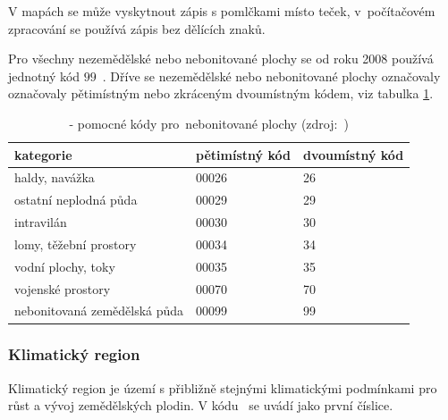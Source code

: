 V mapách se může vyskytnout zápis s pomlčkami místo teček, v~počítačovém zpracování se používá zápis bez dělících znaků.

Pro všechny nezemědělské nebo nebonitované plochy se od roku 2008 používá jednotný kód $99$~\citep{metodika_bpej}. Dříve se nezemědělské nebo nebonitované plochy označovaly označovaly pětimístným nebo zkráceným dvoumístným kódem, viz tabulka \ref{tab:pomocne_kody_bpej}.

\begin{table}[H]
    \begin{tabular}{|l|l|l|}
        \hline
         kategorie & pětimístný kód & dvoumístný kód \\
        \hline
        \hline
         haldy, navážka              	& 00026	& 26 \\ \hline
         ostatní neplodná půda			& 00029	& 29 \\ \hline
         intravilán                   	& 00030	& 30 \\ \hline
         lomy, těžební prostory       	& 00034	& 34 \\ \hline
         vodní plochy, toky           	& 00035	& 35 \\ \hline
         vojenské prostory				& 00070	& 70 \\ \hline
         nebonitovaná zemědělská půda	& 00099	& 99 \\
         \hline
    \end{tabular}
    \centering
    \caption[ - pomocné kódy pro~nebonitované plochy]{ - pomocné kódy pro~nebonitované plochy (zdroj:~\citep{metodika_bpej})}
    \label{tab:pomocne_kody_bpej}
\end{table}

\subsubsection{Klimatický region}
\label{klimaticky_region}

Klimatický region je území s přibližně stejnými klimatickými podmínkami pro růst a vývoj zemědělských plodin. V kódu~ se uvádí jako první číslice.

